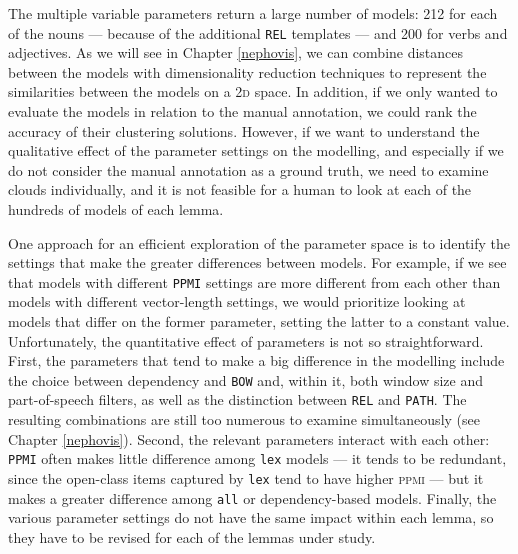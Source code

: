 \documentclass[
]{book}
\begin{document}
The multiple variable parameters return a large number of models: 212 for each of the nouns --- because of the additional \texttt{REL} templates --- and 200 for verbs and adjectives. As we will see in Chapter \ref{nephovis}, we can combine distances between the models with dimensionality reduction techniques to represent the similarities between the models on a \textsc{2d} space. In addition, if we only wanted to evaluate the models in relation to the manual annotation, we could rank the accuracy of their clustering solutions. However, if we want to understand the qualitative effect of the parameter settings on the modelling, and especially if we do not consider the manual annotation as a ground truth, we need to examine clouds individually, and it is not feasible for a human to look at each of the hundreds of models of each lemma.

One approach for an efficient exploration of the parameter space is to identify the settings that make the greater differences between models. For example, if we see that models with different \texttt{PPMI} settings are more different from each other than models with different vector-length settings, we would prioritize looking at models that differ on the former parameter, setting the latter to a constant value. Unfortunately, the quantitative effect of parameters is not so straightforward. First, the parameters that tend to make a big difference in the modelling include the choice between dependency and \texttt{BOW} and, within it, both window size and part-of-speech filters, as well as the distinction between \texttt{REL} and \texttt{PATH}. The resulting combinations are still too numerous to examine simultaneously (see Chapter \ref{nephovis}). Second, the relevant parameters interact with each other: \texttt{PPMI} often makes little difference among \texttt{lex} models --- it tends to be redundant, since the open-class items captured by \texttt{lex} tend to have higher \textsc{ppmi} --- but it makes a greater difference among \texttt{all} or dependency-based models. Finally, the various parameter settings do not have the same impact within each lemma, so they have to be revised for each of the lemmas under study.
\end{document}
